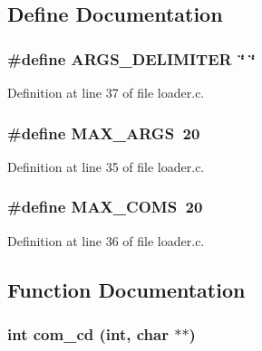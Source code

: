 \subsection{Define Documentation}
\subsubsection[{ARGS\_\-DELIMITER}]{\setlength{\rightskip}{0pt plus 5cm}\#define ARGS\_\-DELIMITER~\char`\"{} \char`\"{}}\label{loader_8c_a1e443b337adbf56ac43ce50e0fc57508}


Definition at line 37 of file loader.c.

\subsubsection[{MAX\_\-ARGS}]{\setlength{\rightskip}{0pt plus 5cm}\#define MAX\_\-ARGS~20}\label{loader_8c_a29b7451465deac204c5f7cb1f9c6e1fc}


Definition at line 35 of file loader.c.

\subsubsection[{MAX\_\-COMS}]{\setlength{\rightskip}{0pt plus 5cm}\#define MAX\_\-COMS~20}\label{loader_8c_a4ba6c04f9aa1a6cff7d6ecd3193eaae8}


Definition at line 36 of file loader.c.



\subsection{Function Documentation}
\subsubsection[{com\_\-cd}]{\setlength{\rightskip}{0pt plus 5cm}int com\_\-cd (int, \/  char $\ast$$\ast$)}\label{loader_8c_a6deccfc39585708f5258d7297539b28f}
